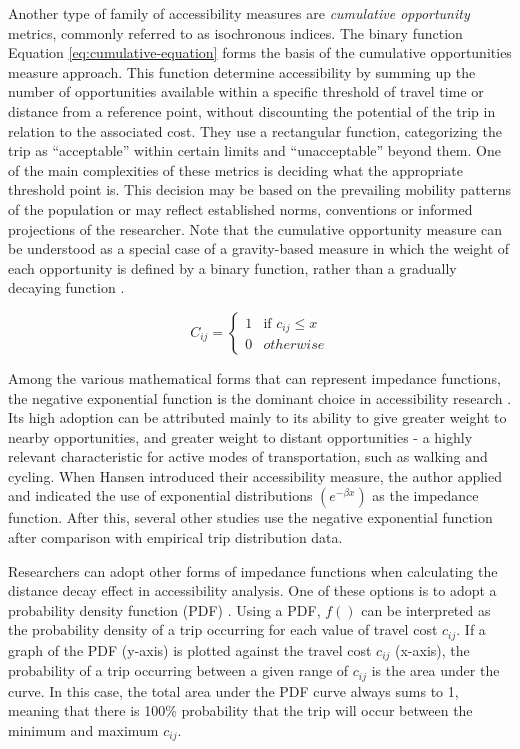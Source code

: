 \documentclass[preprint, 3p,
authoryear]{elsarticle} %
\begin{document}
Another type of family of accessibility measures are \emph{cumulative
opportunity} metrics, commonly referred to as isochronous indices. The
binary function Equation \ref{eq:cumulative-equation} forms the basis of
the cumulative opportunities measure approach. This function determine
accessibility by summing up the number of opportunities available within
a specific threshold of travel time or distance from a reference point,
without discounting the potential of the trip in relation to the
associated cost. They use a rectangular function, categorizing the trip
as ``acceptable'' within certain limits and ``unacceptable'' beyond
them. One of the main complexities of these metrics is deciding what the
appropriate threshold point is. This decision may be based on the
prevailing mobility patterns of the population or may reflect
established norms, conventions or informed projections of the
researcher. Note that the cumulative opportunity measure can be
understood as a special case of a gravity-based measure in which the
weight of each opportunity is defined by a binary function, rather than
a gradually decaying function \citep{pereira2023}.

\begin{equation}
C_{ij} =
\begin{cases}
  1 & \text{if } c_{ij} \le x \\
  0 & otherwise
\end{cases}
\label{eq:cumulative-equation}
\end{equation}

Among the various mathematical forms that can represent impedance
functions, the negative exponential function is the dominant choice in
accessibility research
\citep{hansen1959, apparicio2008comparing, iacono2008access, larsen2010, millward2013active}.
Its high adoption can be attributed mainly to its ability to give
greater weight to nearby opportunities, and greater weight to distant
opportunities - a highly relevant characteristic for active modes of
transportation, such as walking and cycling. When Hansen
\citeyearpar{hansen1959} introduced their accessibility measure, the
author applied and indicated the use of exponential distributions
\((e ^ {-\beta x})\) as the impedance function. After this, several
other studies
\citep{fotheringham1989spatial, de2009exponential, iacono2010, signorino2011gravity, prins2014many}
use the negative exponential function after comparison with empirical
trip distribution data.

Researchers can adopt other forms of impedance functions when
calculating the distance decay effect in accessibility analysis. One of
these options is to adopt a probability density function (PDF)
\citep{soukhov2024}. Using a PDF, \(f()\) can be interpreted as the
probability density of a trip occurring for each value of travel cost
\(c_{ij}\). If a graph of the PDF (y-axis) is plotted against the travel
cost \(c_{ij}\) (x-axis), the probability of a trip occurring between a
given range of \(c_{ij}\) is the area under the curve. In this case, the
total area under the PDF curve always sums to 1, meaning that there is
100\% probability that the trip will occur between the minimum and
maximum \(c_{ij}\).
\end{document}
